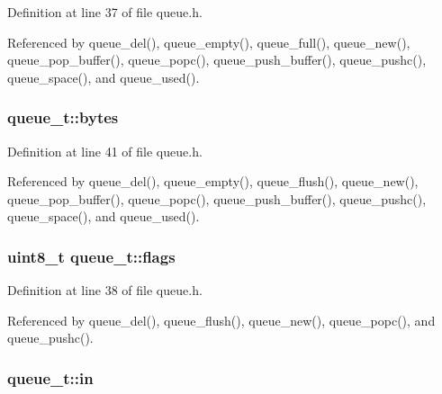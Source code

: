 Definition at line 37 of file queue.\+h.



Referenced by queue\+\_\+del(), queue\+\_\+empty(), queue\+\_\+full(), queue\+\_\+new(), queue\+\_\+pop\+\_\+buffer(), queue\+\_\+popc(), queue\+\_\+push\+\_\+buffer(), queue\+\_\+pushc(), queue\+\_\+space(), and queue\+\_\+used().

\subsubsection[{\texorpdfstring{bytes}{bytes}}]{ queue\+\_\+t\+::bytes}\hypertarget{structqueue__t_a58398d4ee60bc90ffba2bc3488fe185b}{}\label{structqueue__t_a58398d4ee60bc90ffba2bc3488fe185b}


Definition at line 41 of file queue.\+h.



Referenced by queue\+\_\+del(), queue\+\_\+empty(), queue\+\_\+flush(), queue\+\_\+new(), queue\+\_\+pop\+\_\+buffer(), queue\+\_\+popc(), queue\+\_\+push\+\_\+buffer(), queue\+\_\+pushc(), queue\+\_\+space(), and queue\+\_\+used().

\subsubsection[{\texorpdfstring{flags}{flags}}]{\setlength{\rightskip}{0pt plus 5cm}uint8\+\_\+t queue\+\_\+t\+::flags}\hypertarget{structqueue__t_a2a516773a572c746d461c9df3cb30387}{}\label{structqueue__t_a2a516773a572c746d461c9df3cb30387}


Definition at line 38 of file queue.\+h.



Referenced by queue\+\_\+del(), queue\+\_\+flush(), queue\+\_\+new(), queue\+\_\+popc(), and queue\+\_\+pushc().

\subsubsection[{\texorpdfstring{in}{in}}]{ queue\+\_\+t\+::in}\hypertarget{structqueue__t_a7a6832e36c70a1db7fddc93fb6be9d63}{}\label{structqueue__t_a7a6832e36c70a1db7fddc93fb6be9d63}


